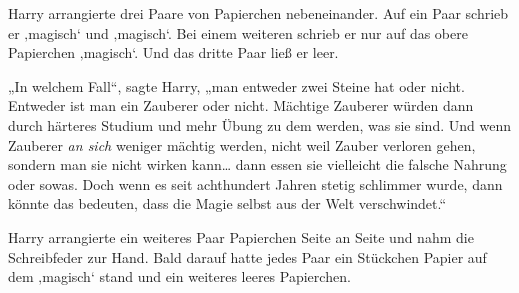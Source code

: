 Harry arrangierte drei Paare von Papierchen nebeneinander. Auf ein Paar schrieb er ‚magisch‘ und ‚magisch‘. Bei einem weiteren schrieb er nur auf das obere Papierchen ‚magisch‘. Und das dritte Paar ließ er leer.

„In welchem Fall“, sagte Harry, „man entweder zwei Steine hat oder nicht. Entweder ist man ein Zauberer oder nicht. Mächtige Zauberer würden dann durch härteres Studium und mehr Übung zu dem werden, was sie sind. Und wenn Zauberer \emph{an sich} weniger mächtig werden, nicht weil Zauber verloren gehen, sondern man sie nicht wirken kann… dann essen sie vielleicht die falsche Nahrung oder sowas. Doch wenn es seit achthundert Jahren stetig schlimmer wurde, dann könnte das bedeuten, dass die Magie selbst aus der Welt verschwindet.“

Harry arrangierte ein weiteres Paar Papierchen Seite an Seite und nahm die Schreibfeder zur Hand. Bald darauf hatte jedes Paar ein Stückchen Papier auf dem ‚magisch‘ stand und ein weiteres leeres Papierchen.

